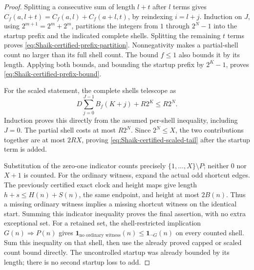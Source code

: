 \begin{proof}
Splitting a consecutive sum of length \(l+t\) after \(l\) terms gives
\(C_f(a,l+t)=C_f(a,l)+C_f(a+l,t)\), by reindexing \(i=l+j\).
Induction on \(J\), using \(2^{m+1}=2^m+2^m\), partitions the
integers from \(1\) through \(2^N-1\) into the startup prefix
and the indicated complete shells. Splitting the remaining \(t\)
terms proves \eqref{eq:Shaik-certified-prefix-partition}.
Nonnegativity makes a partial-shell count no larger than its full
shell count. The bound \(f\le1\) also bounds it by its length.
Applying both bounds, and bounding the startup prefix by \(2^K-1\),
proves \eqref{eq:Shaik-certified-prefix-bound}.

For the scaled statement, the complete shells telescope as
\[
 D\sum_{j=0}^{J-1}B_f(K+j)+R2^K\le R2^N.
\]
Induction proves this directly from the assumed per-shell inequality,
including \(J=0\). The partial shell costs at most \(R2^N\).
Since \(2^N\le X\), the two contributions together are at most
\(2RX\), proving \eqref{eq:Shaik-certified-scaled-tail} after the
startup term is added.

Substitution of the zero-one indicator counts precisely
\(\{1,\ldots,X\}\setminus P\); neither \(0\) nor \(X+1\) is counted.
For the ordinary witness, expand the actual odd shortcut edges.
The previously certified exact clock and height maps give length
\(h+s\le H(n)+S(n)\), the same endpoint, and height at most \(2B(n)\).
Thus a missing ordinary witness implies a missing shortcut witness
on the identical start. Summing this indicator inequality proves
the final assertion, with no extra exceptional set. For a retained set,
the shell-restricted implication \(G(n)\Rightarrow P(n)\) gives
\(\boldsymbol1_{\text{no ordinary witness}}(n)
 \le\boldsymbol1_{\neg G}(n)\) on every counted shell.
Sum this inequality on that shell, then use the already proved capped
or scaled count bound directly. The uncontrolled startup was already
bounded by its length; there is no second startup loss to add.
\end{proof}

